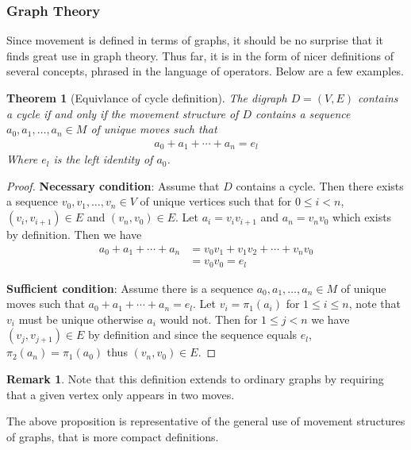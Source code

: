 \documentclass[a4paper,11pt]{article}
\theoremstyle{plain}
\newtheorem{theorem}{Theorem}
\theoremstyle{definition}
\newtheorem*{remark}{Remark}
\begin{document}
\subsubsection{Graph Theory}
Since movement is defined in terms of graphs, it should be no surprise
that it finds great use in graph theory. Thus far, it is in the form
of nicer definitions of several concepts, phrased in the language of
operators. Below are a few examples.
\begin{theorem}[Equivlance of cycle definition]\label{the1}
	The digraph $D=(V,E)$ contains a cycle if and only if the movement
	structure of $D$ contains a sequence $a_0,a_1,\dots,a_n\in M$
	of unique moves such that
	\begin{equation}
	\begin{aligned}
		a_0+a_1+\cdots+a_n= e_l
	\end{aligned}
	\end{equation}
	Where $e_l$ is the left identity of $a_0$.
\end{theorem}
\begin{proof}
	\textbf{Necessary condition}: 
	Assume that $D$ contains a cycle. Then there exists a sequence
	$v_0,v_1, \dots,v_n \in V$ of unique vertices such that for $0\leq
	i < n$, $(v_i,v_{i+1}) \in E$ and $(v_n,v_0) \in E$. Let $a_i =
	v_i v_{i+1}$ and $a_n=v_n v_0$ which exists by definition. Then
	we have
	\begin{equation}
	\begin{aligned}
		a_0+a_1+\cdots + a_n &= v_0 v_1+v_1 v_2+\cdots+v_n v_0 \\
							 &= v_0v_0 = e_l
	\end{aligned}
	\end{equation}
	
	\textbf{Sufficient condition}: 
	Assume there is a sequence $a_0,a_1,\dots,a_n\in M$ of unique
	moves such that $a_0+a_1+\cdots+a_n= e_l$. Let $v_i = \pi_1(a_i)$
	for $1 \leq i \leq n$, note that $v_i$ must be unique otherwise
	$a_i$ would not. Then for $1 \leq j < n$ we have $(v_j,v_{j+1})
	\in E$ by definition and since the sequence equals $e_l$,
	$\pi_2(a_n) = \pi_1(a_0)$ thus $(v_n,v_0)\in E$.
\end{proof}
\begin{remark}
	Note that this definition extends to ordinary graphs by requiring
	that a given vertex only appears in two moves.
\end{remark}
The above proposition is representative of the general use of movement
structures of graphs, that is more compact definitions.
\end{document}
